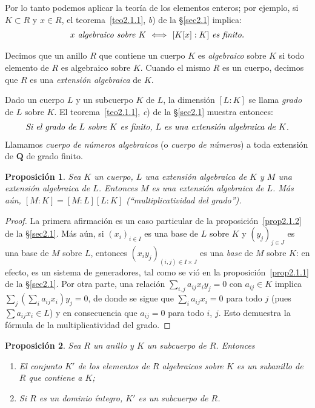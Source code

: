 \documentclass[oneside,bibtotoc,leqno,spanish]{amsbook}
\newcommand{\QQ}{\mathbf{Q}}
\numberwithin{equation}{section}
\theoremstyle{defi}
\theoremstyle{note}
\newtheorem{proposition}{Proposici\'on}
\theoremstyle{rem}
\numberwithin{theorem}{section}
\numberwithin{proposition}{section}
\numberwithin{definition}{section}
\numberwithin{lemma}{section}
\numberwithin{corollary}{section}
\numberwithin{example}{section}
\numberwithin{footnote}{section}%
\begin{document}
Por lo tanto podemos aplicar la teor\'ia de los elementos enteros; por ejemplo, si $K\subset R$ y $x\in R$,
el teorema~\ref{teo2.1.1}, {\itshape b}) de la \S\ref{sec2.1} implica:
\begin{gather}
\text{\itshape $x$ algebraico sobre $K$ $\iff$ $[K[x]:K]$ es finito.}
\end{gather}

Decimos que un anillo $R$ que contiene un cuerpo $K$ es {\em algebraico} sobre $K$ si todo elemento de $R$
es algebraico sobre $K$. Cuando el mismo $R$ es un cuerpo, decimos que $R$ es una {\em extensi\'on algebraica}
de $K$.

Dado un cuerpo $L$ y un subcuerpo $K$ de $L$, la dimensi\'on $[L:K]$ se llama {\em grado} de $L$ sobre $K$.
El teorema~\ref{teo2.1.1}, {\itshape c}) de la \S\ref{sec2.1} muestra entonces:
\begin{gather}
\text{\itshape Si el grado de $L$ sobre $K$ es finito, $L$ es una extensi\'on algebraica de $K$.}
\end{gather}
Llamamos {\em cuerpo de n\'umeros algebraicos} (o {\em cuerpo de n\'umeros}) a toda extensi\'on de $\QQ$
de grado finito.

\begin{proposition}\label{prop2.3.1}
Sea $K$ un cuerpo, $L$ una extensi\'on algebraica de $K$ y $M$ una extensi\'on algebraica de $L$. Entonces
$M$ es una extensi\'on algebraica de $L$. M\'as a\'un, $[M:K] = [M:L][L:K]$
(``multiplicatividad del grado'').
\end{proposition}

\begin{proof}
La primera afirmaci\'on es un caso particular de la proposici\'on~\ref{prop2.1.2} de la \S\ref{sec2.1}.
M\'as a\'un, si $(x_{i})_{i\in I}$
es una base de $L$ sobre $K$ y $(y_{j})_{j\in J}$ es una base de $M$ sobre $L$, entonces $(x_{i}y_{j})_{(i,j)\in I\times J}$
es una {\em base} de $M$ sobre $K$: en efecto, es un sistema de generadores, tal como se vi\'o en la
proposici\'on~\ref{prop2.1.1} de la \S\ref{sec2.1}.
Por otra parte, una relaci\'on $\sum_{i,j}a_{ij}x_{i}y_{j} = 0$ con $a_{ij}\in K$ implica
$\sum_{j}\left(\sum_{i}a_{ij}x_{i}\right)y_{j} = 0$, de donde se sigue que
$\sum_{i}a_{ij}x_{i} = 0$ para todo $j$ (pues
$\sum a_{ij}x_{i}\in L$) y en consecuencia que $a_{ij} = 0$ para todo $i$, $j$. Esto demuestra la f\'ormula
de la multiplicatividad del grado.
\end{proof}

\begin{proposition}
Sea $R$ un anillo y $K$ un subcuerpo de $R$. Entonces
\begin{enumerate}
\item[\upshape a)] El conjunto $K'$ de los elementos de $R$ algebraicos sobre $K$ es un subanillo de $R$ que contiene a $K$;
\item[\upshape b)] Si $R$ es un dominio \'integro, $K'$ es un subcuerpo de $R$.
\end{enumerate}
\end{proposition}
\end{document}
